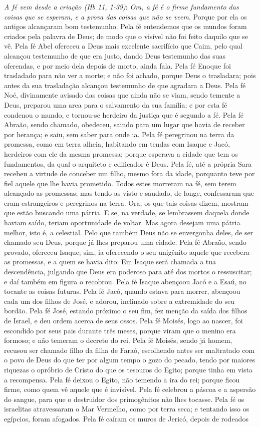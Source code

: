 \documentclass[
]{book}
\begin{document}
\emph{A fé vem desde a criação (Hb 11, 1-39)}: \emph{Ora, a fé é o firme fundamento das coisas que se esperam, e a prova das coisas que não se veem}. Porque por ela os antigos alcançaram bom testemunho. Pela fé entendemos que os mundos foram criados pela palavra de Deus; de modo que o visível não foi feito daquilo que se vê. Pela fé Abel ofereceu a Deus mais excelente sacrifício que Caim, pelo qual alcançou testemunho de que era justo, dando Deus testemunho das suas oferendas, e por meio dela depois de morto, ainda fala. Pela fé Enoque foi trasladado para não ver a morte; e não foi achado, porque Deus o trasladara; pois antes da sua trasladação alcançou testemunho de que agradara a Deus. Pela fé Noé, divinamente avisado das coisas que ainda não se viam, sendo temente a Deus, preparou uma arca para o salvamento da sua família; e por esta fé condenou o mundo, e tornou-se herdeiro da justiça que é segundo a fé. Pela fé Abraão, sendo chamado, obedeceu, saindo para um lugar que havia de receber por herança; e saiu, sem saber para onde ia. Pela fé peregrinou na terra da promessa, como em terra alheia, habitando em tendas com Isaque e Jacó, herdeiros com ele da mesma promessa; porque esperava a cidade que tem os fundamentos, da qual o arquiteto e edificador é Deus. Pela fé, até a própria Sara recebeu a virtude de conceber um filho, mesmo fora da idade, porquanto teve por fiel aquele que lhe havia prometido. Todos estes morreram na fé, sem terem alcançado as promessas; mas tendo-as visto e saudado, de longe, confessaram que eram estrangeiros e peregrinos na terra. Ora, os que tais coisas dizem, mostram que estão buscando uma pátria. E se, na verdade, se lembrassem daquela donde haviam saído, teriam oportunidade de voltar. Mas agora desejam uma pátria melhor, isto é, a celestial. Pelo que também Deus não se envergonha deles, de ser chamado seu Deus, porque já lhes preparou uma cidade. Pela fé Abraão, sendo provado, ofereceu Isaque; sim, ia oferecendo o seu unigênito aquele que recebera as promessas, e a quem se havia dito: Em Isaque será chamada a tua descendência, julgando que Deus era poderoso para até dos mortos o ressuscitar; e daí também em figura o recobrou. Pela fé Isaque abençoou Jacó e a Esaú, no tocante as coisas futuras. Pela fé Jacó, quando estava para morrer, abençoou cada um dos filhos de José, e adorou, inclinado sobre a extremidade do seu bordão. Pela fé José, estando próximo o seu fim, fez menção da saída dos filhos de Israel, e deu ordem acerca de seus ossos. Pela fé Moisés, logo ao nascer, foi escondido por seus pais durante três meses, porque viram que o menino era formoso; e não temeram o decreto do rei. Pela fé Moisés, sendo já homem, recusou ser chamado filho da filha de Faraó, escolhendo antes ser maltratado com o povo de Deus do que ter por algum tempo o gozo do pecado, tendo por maiores riquezas o opróbrio de Cristo do que os tesouros do Egito; porque tinha em vista a recompensa. Pela fé deixou o Egito, não temendo a ira do rei; porque ficou firme, como quem vê aquele que é invisível. Pela fé celebrou a páscoa e a aspersão do sangue, para que o destruidor dos primogênitos não lhes tocasse. Pela fé os israelitas atravessaram o Mar Vermelho, como por terra seca; e tentando isso os egípcios, foram afogados. Pela fé caíram os muros de Jericó, depois de rodeados 
\end{document}
